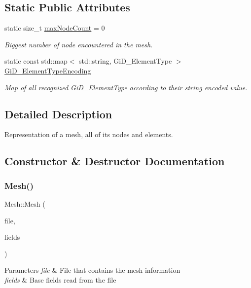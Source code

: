 \subsection*{Static Public Attributes}
\begin{DoxyCompactItemize}
\item 
static size\+\_\+t \hyperlink{classMesh_aba7b72605589dfd0a54bf5fa945774b3}{max\+Node\+Count} = 0
\begin{DoxyCompactList}\small\item\em Biggest number of node encountered in the mesh. \end{DoxyCompactList}\item 
static const std\+::map$<$ std\+::string, Gi\+D\+\_\+\+Element\+Type $>$ \hyperlink{classMesh_a05bb4cbffc09e209148c384a1f84aa9a}{Gi\+D\+\_\+\+Element\+Type\+Encoding}
\begin{DoxyCompactList}\small\item\em Map of all recognized Gi\+D\+\_\+\+Element\+Type according to their string encoded value. \end{DoxyCompactList}\end{DoxyCompactItemize}


\subsection{Detailed Description}
Representation of a mesh, all of its nodes and elements. 

\subsection{Constructor \& Destructor Documentation}
\mbox{\label{classMesh_a7648013c55e45a4cde14d75b14631751}} 
\subsubsection{\texorpdfstring{Mesh()}{Mesh()}}
{\footnotesize\ttfamily Mesh\+::\+Mesh (\begin{DoxyParamCaption}\item[{gz\+File}]{file,  }\item[{\hyperlink{utilities_8h_a981a882ef2a0d7ee5b6b32f27105644e}{data\+Fields}}]{fields }\end{DoxyParamCaption})}


\begin{DoxyParams}{Parameters}
{\em file} & File that contains the mesh information \\
\hline
{\em fields} & Base fields read from the file \\
\hline
\end{DoxyParams}


